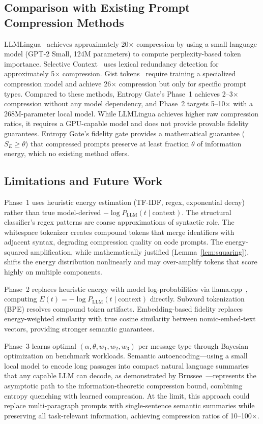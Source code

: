 \documentclass[11pt]{article}
\theoremstyle{remark}
\begin{document}
\subsection{Comparison with Existing Prompt Compression Methods}

LLMLingua~\cite{llmlingua2023} achieves approximately 20$\times$ compression
by using a small language model (GPT-2 Small, 124M parameters) to compute
perplexity-based token importance. Selective Context~\cite{selective_context2023}
uses lexical redundancy detection for approximately 5$\times$ compression.
Gist tokens~\cite{gist2023} require training a specialized compression model
and achieve 26$\times$ compression but only for specific prompt types.
Compared to these methods, Entropy Gate's Phase~1 achieves 2--3$\times$
compression without any model dependency, and Phase~2 targets 5--10$\times$
with a 268M-parameter local model. While LLMLingua achieves higher raw
compression ratios, it requires a GPU-capable model and does not provide
provable fidelity guarantees. Entropy Gate's fidelity gate provides a
mathematical guarantee ($S_E \geq \theta$) that compressed prompts preserve
at least fraction $\theta$ of information energy, which no existing method
offers.

\subsection{Limitations and Future Work}

Phase~1 uses heuristic energy estimation (TF-IDF, regex, exponential decay)
rather than true model-derived $-\log P_{\text{LLM}}(t \mid \text{context})$.
The structural classifier's regex patterns are coarse approximations of
syntactic role. The whitespace tokenizer creates compound tokens that merge
identifiers with adjacent syntax, degrading compression quality on code
prompts. The energy-squared amplification, while mathematically justified
(Lemma~\ref{lem:squaring}), shifts the energy distribution nonlinearly and
may over-amplify tokens that score highly on multiple components.

Phase~2 replaces heuristic energy with model log-probabilities via
llama.cpp~\cite{llamacpp}, computing $E(t) = -\log P_{\text{LLM}}(t \mid
\text{context})$ directly. Subword tokenization (BPE) resolves compound
token artifacts. Embedding-based fidelity replaces energy-weighted
similarity with true cosine similarity between nomic-embed-text vectors,
providing stronger semantic guarantees.

Phase~3 learns optimal $(\alpha, \theta, w_1, w_2, w_3)$ per message
type through Bayesian optimization on benchmark workloads. Semantic
autoencoding---using a small local model to encode long passages into
compact natural language summaries that any capable LLM can decode,
as demonstrated by Brussee~\cite{brussee2025autoencoder}---represents the
asymptotic path to the information-theoretic compression bound, combining
entropy quenching with learned compression. At the limit, this approach
could replace multi-paragraph prompts with single-sentence semantic
summaries while preserving all task-relevant information, achieving
compression ratios of 10--100$\times$.
\end{document}
